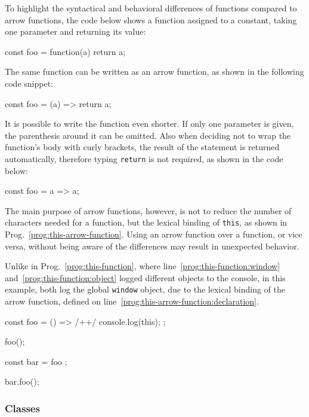 To highlight the syntactical and behavioral differences of functions compared to arrow functions, the code below shows a function assigned to a constant, taking one parameter and returning its value:
\begin{JsCode}[numbers=none]
const foo = function(a) {
  return a;
}
\end{JsCode}
The same function can be written as an arrow function, as shown in the following code snippet:
\begin{JsCode}[numbers=none]
const foo = (a) => {
  return a;
}
\end{JsCode}
It is possible to write the function even shorter. If only one parameter is given, the parenthesis around it can be omitted. Also when deciding not to wrap the function's body with curly brackets, the result of the statement is returned automatically, therefore typing \texttt{return} is not required, as shown in the code below:
\begin{JsCode}[numbers=none]
const foo = a => a;
\end{JsCode}
The main purpose of arrow functions, however, is not to reduce the number of characters needed for a function, but the lexical binding of \texttt{this}, as shown in Prog.~\ref{prog:this-arrow-function}. Using an arrow function over a function, or vice versa, without being aware of the differences may result in unexpected behavior.
\begin{program}[h]
\caption{Unlike in Prog.~\ref{prog:this-function}, where line~\ref{prog:this-function:window} and~\ref{prog:this-function:object} logged different objects to the console, in this example, both log the global \texttt{window} object, due to the lexical binding of the arrow function, defined on line~\ref{prog:this-arrow-function:declaration}.}
\label{prog:this-arrow-function}
\begin{JsCode}
const foo = () => { /+\label{prog:this-arrow-function:declaration}+/
  console.log(this);
};

foo();

const bar = { foo };

bar.foo();
\end{JsCode}
\end{program}

\subsubsection{Classes}

